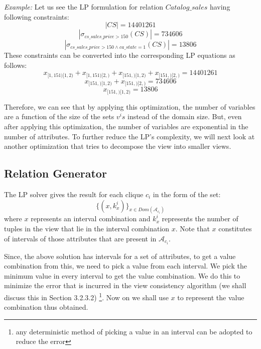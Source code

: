\documentclass[]{article}
\begin{document}
\begin{multicols}{2}
			{\em Example:} 
			Let us see the LP formulation for relation $Catalog\_sales$ having following constraints:
			\begin{equation*}
				|CS| = 14401261
			\end{equation*}
			\begin{equation*}
				|\sigma_{cs\_sales\_price > 150} (CS)| = 734606
			\end{equation*}
			\begin{equation*}
				|\sigma_{cs\_sales\_price > 150 \wedge ca\_state = 1} (CS)| = 13806
			\end{equation*}
			These constraints can be converted into the corresponding LP equations as follows:
			\begin{equation*}
				x_{[1,151)[1,2)} + x_{[1,151)[2,)} + x_{[151,)[1,2)} + x_{[151,)[2,)} = 14401261
			\end{equation*}
			\begin{equation*}
				x_{[151,)[1,2)} + x_{[151,)[2,)} = 734606
			\end{equation*}
			\begin{equation*}
				x_{[151,)[1,2)} = 13806
			\end{equation*}
			
			Therefore, we can see that by applying this optimization, the number of variables are a function of the size of the sets $v^{i}s$ instead of the domain size. 
			But, even after applying this optimization, the number of variables are exponential in the number of attributes. 
			To further reduce the LP's complexity, we will next look at another optimization that tries to decompose the view into smaller views.
			
			
			\subsection{Relation Generator}
			The LP solver gives the result for each clique $c_{i}$ in the form of the set:
			\[\{(x, k_{x}^{i})\}_{x \in Dom(\mathcal{A}_{c_{i}})}\]
			where $x$ represents an interval combination and $k_{x}^{i}$ represents the number of tuples in the view that lie in the interval combination $x$. 
			Note that $x$ constitutes of intervals of those attributes that are present in $\mathcal{A}_{c_{i}}$.
			
			Since, the above solution has intervals for a set of attributes, to get a value combination from this, we need to pick a value from each interval. 
			We pick the minimum value in every interval to get the value combination. 
			We do this to minimize the error that is incurred in the view consistency algorithm (we shall discuss this in Section 3.2.3.2)
			\footnote{any deterministic method of picking a value in an interval can be adopted to reduce the error}. 
			Now on we shall use $x$ to represent the value combination thus obtained.
			

\end{multicols}
\end{document}
